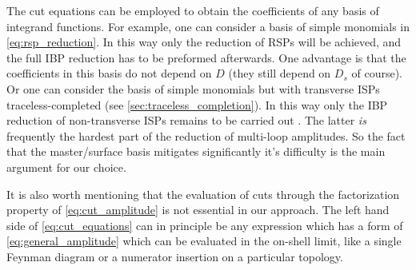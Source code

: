 The cut equations can be employed to obtain the coefficients of any basis of integrand functions. 
For example, one can consider a basis of simple monomials in \cref{eq:rsp_reduction}.
In this way only the reduction of RSPs will be achieved, and the full IBP reduction has to be preformed afterwards.
One advantage is that the coefficients in this basis do not depend on $D$ (they still depend on $D_s$ of course).
Or one can consider the basis of simple monomials but with transverse ISPs traceless-completed (see \cref{sec:traceless_completion}).
In this way only the IBP reduction of non-transverse ISPs remains to be carried out .
The latter \textit{is} frequently the hardest part of the reduction of multi-loop amplitudes. 
So the fact that the master/surface basis mitigates significantly it's difficulty is the main argument for our choice.

It is also worth mentioning that the evaluation of cuts through the 
factorization property of \cref{eq:cut_amplitude} is not essential in our approach. 
The left hand side of \cref{eq:cut_equations} can in principle be any 
expression which has a form of \cref{eq:general_amplitude} which can be evaluated in the on-shell limit,
like a single Feynman diagram or a numerator insertion on a particular topology. 





